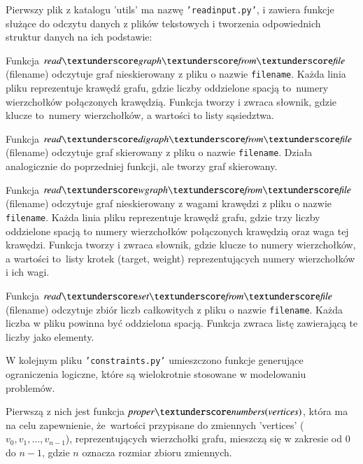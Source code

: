 Pierwszy plik z katalogu 'utils' ma nazwę \texttt{'read\textunderscore input.py'}, i zawiera funkcje służące do odczytu danych z plików tekstowych i tworzenia odpowiednich struktur danych na ich podstawie:

Funkcja $\readgraph$(filename) odczytuje graf nieskierowany z pliku o nazwie \texttt{filename}. Każda linia pliku reprezentuje krawędź grafu, gdzie liczby oddzielone spacją to~numery wierzchołków połączonych krawędzią. Funkcja tworzy i zwraca słownik, gdzie klucze to~numery wierzchołków, a wartości to listy sąsiedztwa.


\vspace{0.5cm}

Funkcja $\readdigraph$(filename) odczytuje graf skierowany z pliku o nazwie \texttt{filename}. Działa analogicznie do poprzedniej funkcji, ale tworzy graf skierowany.


\vspace{0.5cm}

Funkcja $\readwgraph$(filename) odczytuje graf nieskierowany z wagami krawędzi z pliku o nazwie \texttt{filename}. Każda linia pliku reprezentuje krawędź grafu, gdzie trzy liczby oddzielone spacją to numery wierzchołków połączonych krawędzią oraz waga tej krawędzi. Funkcja tworzy i zwraca słownik, gdzie klucze to numery wierzchołków, a wartości to~listy krotek (target, weight) reprezentujących numery wierzchołków i ich wagi.


\vspace{0.5cm}

Funkcja $\readset$(filename) odczytuje zbiór liczb całkowitych z pliku o nazwie \texttt{filename}. Każda liczba w pliku powinna być oddzielona spacją. Funkcja zwraca listę zawierającą te liczby jako elementy.


\vspace{1cm}

W kolejnym pliku \texttt{'constraints.py'} umieszczono funkcje generujące ograniczenia logiczne, które są wielokrotnie stosowane w modelowaniu problemów.

Pierwszą z nich jest funkcja $\propernumbers \mli{(vertices)}$, która ma na celu zapewnienie, że~wartości przypisane do zmiennych 'vertices' ($v_0, v_1, …, v_{n-1}$), reprezentujących wierzchołki grafu, mieszczą się w zakresie od $0$ do $n - 1$, gdzie $n$ oznacza rozmiar zbioru zmiennych.

